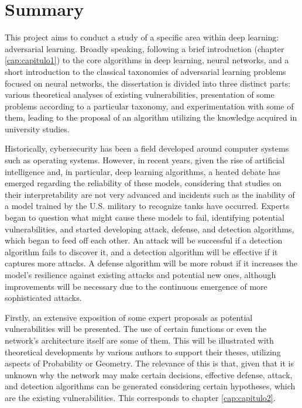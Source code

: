 %

\chapter{Summary}



This project aims to conduct a study of a specific area within deep learning: adversarial learning. Broadly speaking, following a brief introduction (chapter \ref{cap:capitulo1}) to the core algorithms in deep learning, neural networks, and a short introduction to the classical taxonomies of adversarial learning problems focused on neural networks, the dissertation is divided into three distinct parts: various theoretical analyses of existing vulnerabilities, presentation of some problems according to a particular taxonomy, and experimentation with some of them, leading to the proposal of an algorithm utilizing the knowledge acquired in university studies.

Historically, cybersecurity has been a field developed around computer systems such as operating systems. However, in recent years, given the rise of artificial intelligence and, in particular, deep learning algorithms, a heated debate has emerged regarding the reliability of these models, considering that studies on their interpretability are not very advanced and incidents such as the inability of a model trained by the U.S. military to recognize tanks have occurred. Experts began to question what might cause these models to fail, identifying potential vulnerabilities, and started developing attack, defense, and detection algorithms, which began to feed off each other. An attack will be successful if a detection algorithm fails to discover it, and a detection algorithm will be effective if it captures more attacks. A defense algorithm will be more robust if it increases the model's resilience against existing attacks and potential new ones, although improvements will be necessary due to the continuous emergence of more sophisticated attacks.

Firstly, an extensive exposition of some expert proposals as potential vulnerabilities will be presented. The use of certain functions or even the network's architecture itself are some of them. This will be illustrated with theoretical developments by various authors to support their theses, utilizing aspects of Probability or Geometry. The relevance of this is that, given that it is unknown why the network may make certain decisions, effective defense, attack, and detection algorithms can be generated considering certain hypotheses, which are the existing vulnerabilities. This corresponds to chapter \ref{cap:capitulo2}.

